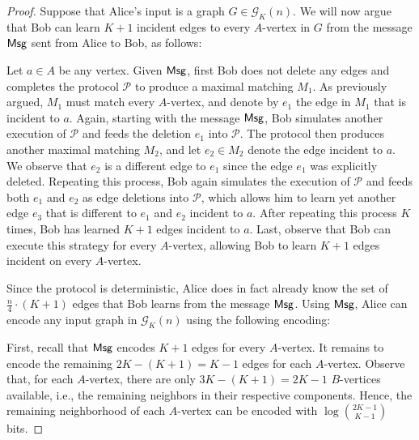 \documentclass[11pt,a4paper]{article}
\begin{document}
\begin{proof}
Suppose that Alice's input is a graph $G \in \mathcal{G}_K(n)$. We will now argue that Bob can learn $K+1$ incident edges to every $A$-vertex in $G$ from the message ${\sf Msg}$ sent from Alice to Bob, as follows:

Let $a \in A$ be any vertex. Given ${\sf Msg}$, first Bob does not delete any edges and completes the protocol $\mathcal{P}$ to produce a maximal matching $M_1$. As previously argued, $M_1$ must match every $A$-vertex, and denote by $e_1$ the edge in $M_1$ that is incident to $a$. Again, starting with the message ${\sf Msg}$, Bob simulates another execution of $\mathcal{P}$ and feeds the deletion $e_1$ into $\mathcal{P}$. The protocol then produces another maximal matching $M_2$, and let $e_2 \in M_2$ denote the edge incident to $a$. We observe that $e_2$ is a different edge to $e_1$ since the edge $e_1$ was explicitly deleted. Repeating this process, Bob again simulates the execution of $\mathcal{P}$ and feeds both $e_1$ and $e_2$ as edge deletions into $\mathcal{P}$, which allows him to learn yet another edge $e_3$ that is different to $e_1$ and $e_2$ incident to $a$. After repeating this process $K$ times, Bob has learned $K+1$ edges incident to $a$. Last, observe that Bob can execute this strategy for every $A$-vertex, allowing Bob to learn $K+1$ edges incident on every $A$-vertex.

Since the protocol is deterministic, Alice does in fact already know the set of $\frac{n}{4} \cdot (K+1)$ edges that Bob learns from the message ${\sf Msg}$. Using ${\sf Msg}$, Alice can encode any input graph in $\mathcal{G}_K(n)$ using the following encoding: 

First, recall that ${\sf Msg}$ encodes $K+1$ edges for every $A$-vertex. It remains to encode the remaining $2K-(K+1) = K-1$ edges for each $A$-vertex. Observe that, for each $A$-vertex, there are only $3K - (K+1) = 2K-1$ $B$-vertices available, i.e., the remaining neighbors in their respective components. Hence, the remaining neighborhood of each $A$-vertex can be encoded with $\log{2K-1 \choose K-1}$ bits. 


\end{proof}
\end{document}
